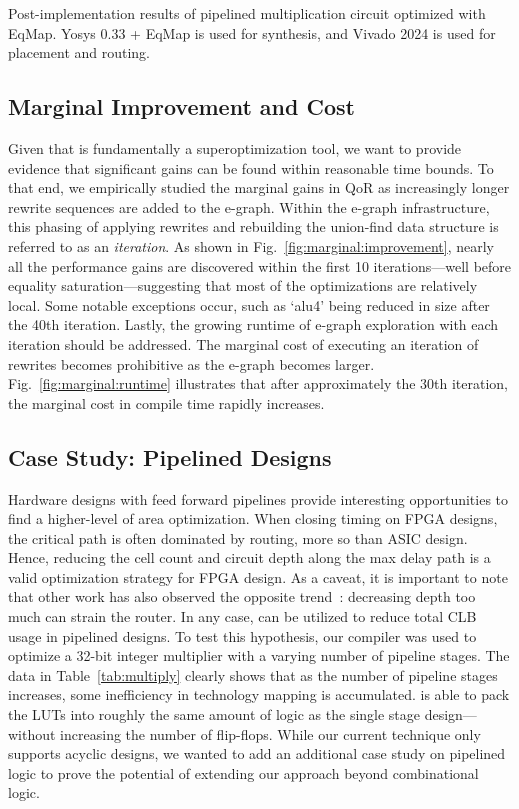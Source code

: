 \begin{table}[t]
    \centering
    \caption{Post-implementation results of pipelined multiplication circuit optimized with EqMap. Yosys 0.33 + EqMap is used for synthesis, and Vivado 2024 is used for placement and routing.}\label{tab:multiply}
\end{table}

\subsection{Marginal Improvement and Cost}\label{sec:results:margin}

Given that \shortname{} is fundamentally a superoptimization tool, we want to
provide evidence that significant gains can be found within reasonable time
bounds. To that end, we empirically studied the marginal gains in QoR as
increasingly longer rewrite sequences are added to the e-graph. Within the
e-graph infrastructure, this phasing of applying rewrites and rebuilding the
union-find data structure is referred to as an \textit{iteration}. As shown in
Fig.~\ref{fig:marginal:improvement}, nearly all the performance gains are
discovered within the first 10 iterations---well before equality
saturation---suggesting that most of the optimizations are relatively local.
Some notable exceptions occur, such as `alu4' being reduced in size after the
40th iteration. Lastly, the growing runtime of e-graph exploration with each
iteration should be addressed. The marginal cost of executing an iteration of
rewrites becomes prohibitive as the e-graph becomes larger.
Fig.~\ref{fig:marginal:runtime} illustrates that after approximately the 30th
iteration, the marginal cost in compile time rapidly increases.

\subsection{Case Study: Pipelined Designs}\label{sec:results:retiming}

Hardware designs with feed forward pipelines provide interesting opportunities
to find a higher-level of area optimization. When closing timing on FPGA
designs, the critical path is often dominated by routing, more so than ASIC
design. Hence, reducing the cell count and circuit depth along the max delay
path is a valid optimization strategy for FPGA design. As a caveat, it is
important to note that other work has also observed the opposite
trend~\cite{academicfpga}: decreasing depth too much can strain the router. In
any case, \shortname{} can be utilized to reduce total CLB usage in pipelined
designs. To test this hypothesis, our compiler was used to optimize a 32-bit
integer multiplier with a varying number of pipeline stages. The data in
Table~\ref{tab:multiply} clearly shows that as the number of pipeline stages
increases, some inefficiency in technology mapping is accumulated. \shortname{}
is able to pack the LUTs into roughly the same amount of logic as the single
stage design---without increasing the number of flip-flops. While our current
technique only supports acyclic designs, we wanted to add an additional case
study on pipelined logic to prove the potential of extending our approach
beyond combinational logic.

